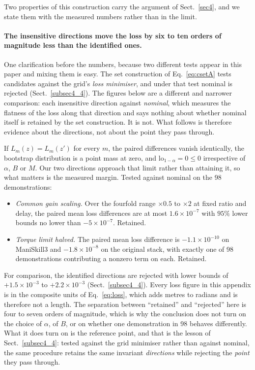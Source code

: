 \documentclass[pdflatex,iicol,sn-apa]{sn-jnl}
\theoremstyle{remark}
\begin{document}
\begin{appendices}
Two properties of this construction carry the argument of Sect.~\ref{sec4}, and we state them with
the measured numbers rather than in the limit.

\paragraph{The insensitive directions move the loss by six to ten orders of magnitude less than the
identified ones.}
One clarification before the numbers, because two different tests appear in this paper and mixing
them is easy. The set construction of Eq.~\eqref{eq:csetA} tests candidates against the grid's
\emph{loss minimiser}, and under that test nominal is rejected (Sect.~\ref{subsec4_4}). The figures
below are a different and narrower comparison: each insensitive direction against \emph{nominal},
which measures the flatness of the loss along that direction and says nothing about whether nominal
itself is retained by the set construction. It is not. What follows is therefore evidence about the
directions, not about the point they pass through.

If $L_m(z) = L_m(z')$ for every $m$, the paired differences vanish identically, the bootstrap
distribution is a point mass at zero, and $\mathrm{lo}_{1-\alpha} = 0 \le 0$ irrespective of $\alpha$,
$B$ or $M$. Our two directions approach that limit rather than attaining it, so what matters is the
measured margin. Tested against nominal on the 98 demonstrations:

\begin{itemize}
\item \emph{Common gain scaling.} Over the fourfold range $\times 0.5$ to $\times 2$ at fixed ratio
and delay, the paired mean loss differences are at most $1.6\times10^{-7}$ with $95\%$ lower bounds
no lower than $-5\times10^{-7}$. Retained.
\item \emph{Torque limit halved.} The paired mean loss difference is $-1.1\times10^{-10}$ on
ManiSkill3 and $-1.8\times10^{-8}$ on the original stack, with exactly one of 98 demonstrations
contributing a nonzero term on each. Retained.
\end{itemize}

\noindent For comparison, the identified directions are rejected with lower bounds of
$+1.5\times10^{-3}$ to $+2.2\times10^{-3}$ (Sect.~\ref{subsec4_4}). Every loss figure in this
appendix is in the composite units of Eq.~\eqref{eq:loss}, which adds metres to radians and is
therefore not a length. The separation between
``retained'' and ``rejected'' here is four to seven orders of magnitude, which is why the conclusion
does not turn on the choice of $\alpha$, of $B$, or on whether one demonstration in 98 behaves
differently. What it does turn on is the reference point, and that is the lesson of
Sect.~\ref{subsec4_4}: tested against the grid minimiser rather than against nominal, the same
procedure retains the same invariant \emph{directions} while rejecting the \emph{point} they pass
through.


\end{appendices}
\end{document}
